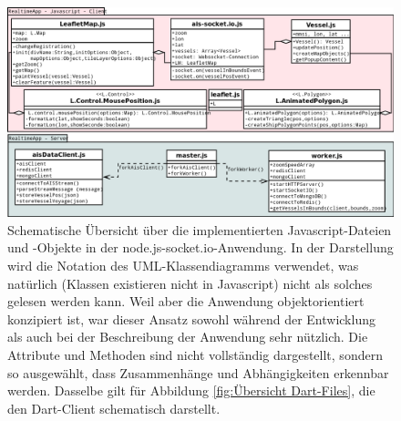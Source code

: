 \begin{figure}[H]
  \centering
  \includegraphics[width=6in]{images/Javascript-Dateien-undObjekte.png}
  \caption[Übersicht über die implementierten Javascript-Dateien und -Objekte]{Schematische Übersicht über die implementierten Javascript-Dateien und -Objekte in der node.js-socket.io-Anwendung. In der Darstellung wird die Notation des UML-Klassendiagramms verwendet, was natürlich (Klassen existieren nicht in Javascript) nicht als solches gelesen werden kann. Weil aber die Anwendung objektorientiert konzipiert ist, war dieser Ansatz sowohl während der Entwicklung als auch bei der Beschreibung der Anwendung sehr nützlich. Die Attribute und Methoden sind nicht vollständig dargestellt, sondern so ausgewählt, dass Zusammenhänge und Abhängigkeiten erkennbar werden.
Dasselbe gilt für Abbildung  \ref{fig:Übersicht Dart-Files}, die den Dart-Client schematisch darstellt. }
  \label{fig:Übersicht Javascript-Files}
\end{figure}
